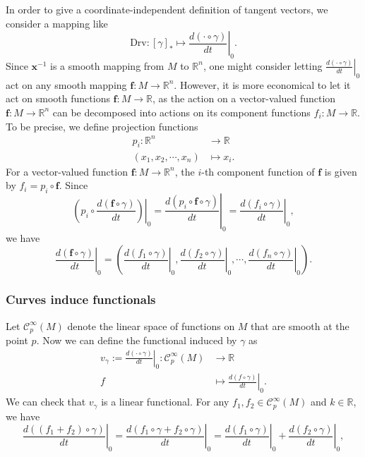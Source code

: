 \documentclass{report}
\begin{document}
In order to give a coordinate-independent definition of tangent vectors, we consider a mapping like
\[
    \mathrm{Drv}:[\gamma]_*\longmapsto\left.\frac{d(\cdot \circ \gamma)}{dt}\right|_0.
\]
Since $\mathbf{x}^{-1}$ is a smooth mapping from $M$ to $\mathbb{R}^n$, one might consider letting $\left. \frac{d(\cdot \circ \gamma)}{dt} \right|_0$ act on any smooth mapping $\mathbf{f}:M\to\mathbb{R}^n$. However, it is more economical to let it act on smooth functions $\mathbf{f}:M\to\mathbb{R}$, as the action on a vector-valued function $\mathbf{f}:M\to\mathbb{R}^n$ can be decomposed into actions on its component functions $f_i:M\to\mathbb{R}$. To be precise, we define projection functions
\[
\begin{aligned}
    p_i:\mathbb{R}^n&\longrightarrow \mathbb{R}\\
    (x_1,x_2,\cdots,x_n)&\longmapsto x_i.
\end{aligned}
\]
For a vector-valued function $\mathbf{f} : M \to \mathbb{R}^n$, the $i$-th component function of $\mathbf{f}$ is given by $f_i = p_i \circ \mathbf{f}$. Since
\[
    \left(p_i\circ\left.\frac{d(\mathbf{f} \circ \gamma)}{dt}\right)\right|_0=\left.\frac{d(p_i\circ\mathbf{f} \circ \gamma)}{dt}\right|_0=\left.\frac{d(f_i \circ \gamma)}{dt}\right|_0,
\]
we have
\[
    \left.\frac{d(\mathbf{f} \circ \gamma)}{dt}\right|_0=\left(\left.\frac{d(f_1 \circ \gamma)}{dt}\right|_0,\left.\frac{d(f_2 \circ \gamma)}{dt}\right|_0,\cdots,\left.\frac{d(f_n \circ \gamma)}{dt}\right|_0\right).
\]
\subsubsection{Curves induce functionals}
Let $\mathcal{C}^{\infty}_p(M)$ denote the linear space of functions on $M$ that are smooth at the point $p$. Now we can define the functional induced by $\gamma$ as 
\[
\begin{aligned}
    v_\gamma:=\left.\frac{d(\cdot \circ
\gamma)}{dt}\right|_0:\mathcal{C}^{\infty}_p(M)&\longrightarrow \mathbb{R}\\
    f&\longmapsto \left.\frac{d(f \circ \gamma)}{dt}\right|_0.
\end{aligned}
\]
We can check that $v_\gamma$ is a linear functional. For any $f_1,f_2\in\mathcal{C}^{\infty}_p(M)$ and $k\in\mathbb{R}$, we have
$$
\left.\frac{d((f_1+f_2) \circ \gamma)}{dt}\right|_0=\left.\frac{d(f_1\circ \gamma+f_2\circ \gamma )}{dt}\right|_0=\left.\frac{d(f_1\circ \gamma)}{dt}\right|_0+\left.\frac{d(f_2\circ \gamma)}{dt}\right|_0,
$$
\end{document}
